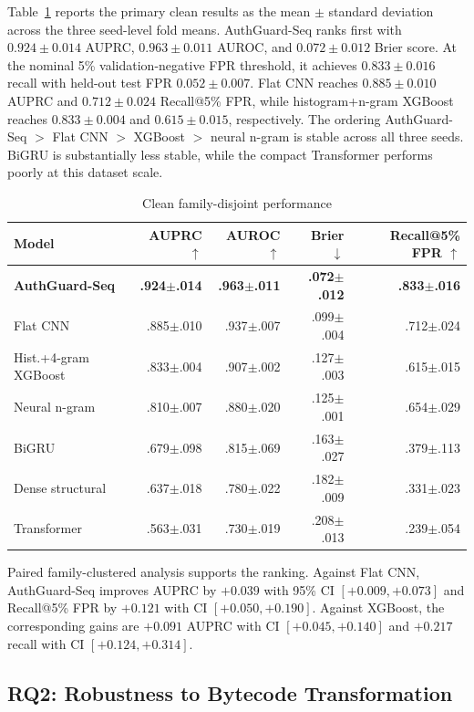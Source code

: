 \documentclass[conference]{IEEEtran}
\begin{document}
Table~\ref{tab:clean} reports the primary clean results as the mean $\pm$ standard deviation across the three seed-level fold means. AuthGuard-Seq ranks first with $0.924\pm0.014$ AUPRC, $0.963\pm0.011$ AUROC, and $0.072\pm0.012$ Brier score. At the nominal 5\% validation-negative FPR threshold, it achieves $0.833\pm0.016$ recall with held-out test FPR $0.052\pm0.007$. Flat CNN reaches $0.885\pm0.010$ AUPRC and $0.712\pm0.024$ Recall@5\% FPR, while histogram+n-gram XGBoost reaches $0.833\pm0.004$ and $0.615\pm0.015$, respectively. The ordering AuthGuard-Seq $>$ Flat CNN $>$ XGBoost $>$ neural n-gram is stable across all three seeds. BiGRU is substantially less stable, while the compact Transformer performs poorly at this dataset scale.

\begin{table}[t]
\centering
\caption{Clean family-disjoint performance}
\label{tab:clean}
\scriptsize
\begin{tabularx}{\columnwidth}{@{}X r r r r@{}}
\toprule
Model & AUPRC $\uparrow$ & AUROC $\uparrow$ & Brier $\downarrow$ & Recall@5\% FPR $\uparrow$ \\
\midrule
\textbf{AuthGuard-Seq} & \textbf{.924$\pm$.014} & \textbf{.963$\pm$.011} & \textbf{.072$\pm$.012} & \textbf{.833$\pm$.016} \\
Flat CNN & .885$\pm$.010 & .937$\pm$.007 & .099$\pm$.004 & .712$\pm$.024 \\
Hist.+4-gram XGBoost & .833$\pm$.004 & .907$\pm$.002 & .127$\pm$.003 & .615$\pm$.015 \\
Neural n-gram & .810$\pm$.007 & .880$\pm$.020 & .125$\pm$.001 & .654$\pm$.029 \\
BiGRU & .679$\pm$.098 & .815$\pm$.069 & .163$\pm$.027 & .379$\pm$.113 \\
Dense structural & .637$\pm$.018 & .780$\pm$.022 & .182$\pm$.009 & .331$\pm$.023 \\
Transformer & .563$\pm$.031 & .730$\pm$.019 & .208$\pm$.013 & .239$\pm$.054 \\
\bottomrule
\end{tabularx}
\end{table}

Paired family-clustered analysis supports the ranking. Against Flat CNN, AuthGuard-Seq improves AUPRC by $+0.039$ with 95\% CI $[+0.009,+0.073]$ and Recall@5\% FPR by $+0.121$ with CI $[+0.050,+0.190]$. Against XGBoost, the corresponding gains are $+0.091$ AUPRC with CI $[+0.045,+0.140]$ and $+0.217$ recall with CI $[+0.124,+0.314]$.

\subsection{RQ2: Robustness to Bytecode Transformation}
\end{document}
